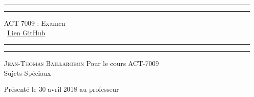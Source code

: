 \begin{titlepage}
	\centering %
	
	\scshape %
	
	\vspace*{\baselineskip} %
	
	
	\rule{\textwidth}{1.6pt}\vspace*{-\baselineskip}\vspace*{2pt} %
	\rule{\textwidth}{0.4pt} %
	
	\vspace{0.75\baselineskip} %
	
	{\LARGE ACT-7009 : Examen \\} %
	\ \href{https://github.com/stecaron/stt-7330-projet-2}{Lien GitHub}
	\vspace{0.75\baselineskip} %
	
	\rule{\textwidth}{0.4pt}\vspace*{-\baselineskip}\vspace{3.2pt} %
	\rule{\textwidth}{1.6pt} %
	
	\vspace{2\baselineskip} %
	
	{\scshape\Large Jean-Thomas Baillargeon } %
	Pour le cours ACT-7009\\
	Sujets Spéciaux \\%
	
	\vspace*{3\baselineskip} %
	
	
	Présenté le 30 avril 2018 au professeur
	

\end{titlepage}
